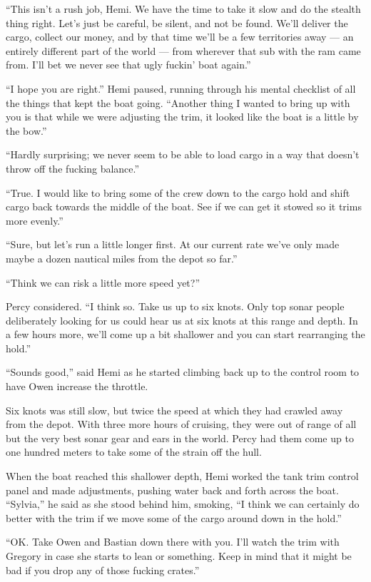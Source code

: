 \documentclass[
]{scrbook}
\begin{document}
``This isn't a rush job, Hemi. We have the time to take it slow and do
the stealth thing right. Let's just be careful, be silent, and not be
found. We'll deliver the cargo, collect our money, and by that time
we'll be a few territories away --- an entirely different part of the
world --- from wherever that sub with the ram came from. I'll bet we
never see that ugly fuckin' boat again.''

``I hope you are right.'' Hemi paused, running through his mental
checklist of all the things that kept the boat going. ``Another thing I
wanted to bring up with you is that while we were adjusting the trim, it
looked like the boat is a little by the bow.''

``Hardly surprising; we never seem to be able to load cargo in a way
that doesn't throw off the fucking balance.''

``True. I would like to bring some of the crew down to the cargo hold
and shift cargo back towards the middle of the boat. See if we can get
it stowed so it trims more evenly.''

``Sure, but let's run a little longer first. At our current rate we've
only made maybe a dozen nautical miles from the depot so far.''

``Think we can risk a little more speed yet?''

Percy considered. ``I think so. Take us up to six knots. Only top sonar
people deliberately looking for us could hear us at six knots at this
range and depth. In a few hours more, we'll come up a bit shallower and
you can start rearranging the hold.''

``Sounds good,'' said Hemi as he started climbing back up to the control
room to have Owen increase the throttle.

\bigskip

Six knots was still slow, but twice the speed at which they had crawled
away from the depot. With three more hours of cruising, they were out of
range of all but the very best sonar gear and ears in the world. Percy
had them come up to one hundred meters to take some of the strain off
the hull.

When the boat reached this shallower depth, Hemi worked the tank trim
control panel and made adjustments, pushing water back and forth across
the boat. ``Sylvia,'' he said as she stood behind him, smoking, ``I
think we can certainly do better with the trim if we move some of the
cargo around down in the hold.''

``OK. Take Owen and Bastian down there with you. I'll watch the trim
with Gregory in case she starts to lean or something. Keep in mind that
it might be bad if you drop any of those fucking crates.''
\end{document}
